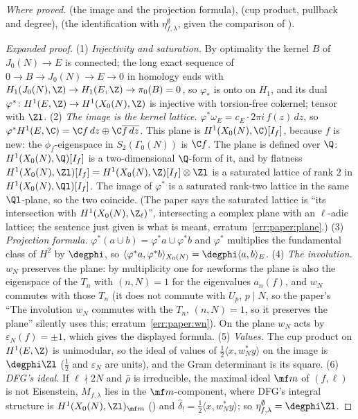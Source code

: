 \begin{sloppypar}
\noindent\emph{Where proved.}  (the image and the projection formula),  (cup product, pullback and degree),  (the
identification with $\eta^\emptyset_{f,\lambda}$, given the comparison of ).

\begin{proof}[Expanded proof]
(1) \emph{Injectivity and saturation.} By optimality the kernel $B$ of $J_0(N)\to E$ is connected; the long exact sequence of $0\to B\to J_0(N)\to E\to0$ in homology ends with
$H_1(J_0(N),\Z)\to H_1(E,\Z)\to\pi_0(B)=0$, so $\varphi_*$ is onto on $H_1$, and its dual $\varphi^*\colon H^1(E,\Z)\to H^1(X_0(N),\Z)$ is injective with torsion-free cokernel; tensor with $\Zl$.
(2) \emph{The image is the kernel lattice.} $\varphi^*\omega_E=c_E\cdot2\pi i\,f(z)\,dz$, so $\varphi^*H^1(E,\C)=\C f\,dz\oplus\C\overline{f\,dz}$. This plane is $H^1(X_0(N),\C)[I_f]$, because $f$ is new: the
$\phi_f$-eigenspace in $S_2(\Gamma_0(N))$ is $\C f$. The plane is defined over $\Q$: $H^1(X_0(N),\Q)[I_f]$ is a two-dimensional $\Q$-form of it, and by flatness
$H^1(X_0(N),\Zl)[I_f]=H^1(X_0(N),\Z)[I_f]\otimes\Zl$ is a saturated lattice of rank $2$ in $H^1(X_0(N),\Ql)[I_f]$. The image of $\varphi^*$ is a saturated rank-two lattice in the same
$\Ql$-plane, so the two coincide. (The paper says the saturated lattice is ``its intersection with $H^1(X_0(N),\Z_\ell)$'', intersecting a complex plane with an $\ell$-adic lattice;
the sentence just given is what is meant, erratum~\ref{err:paper:plane}.) (3) \emph{Projection formula.} $\varphi^*(a\cup b)=\varphi^*a\cup\varphi^*b$ and $\varphi^*$ multiplies the fundamental
class of $H^2$ by $\degphi$, so $\langle\varphi^*a,\varphi^*b\rangle_{X_0(N)}=\degphi\langle a,b\rangle_E$. (4) \emph{The involution.} $w_N$ preserves the plane: by multiplicity one for newforms the
plane is also the eigenspace of the $T_n$ with $(n,N)=1$ for the eigenvalues $a_n(f)$, and $w_N$ commutes with those $T_n$ (it does not commute with $U_p$, $p\mid N$, so the
paper's ``The involution $w_N$ commutes with the $T_n$, $(n,N)=1$, so it preserves the plane'' silently uses this; erratum~\ref{err:paper:wn}). On the plane $w_N$ acts by
$\varepsilon_N(f)=\pm1$, which gives the displayed formula. (5) \emph{Values.} The cup product on $H^1(E,\Z)$ is unimodular, so the ideal of values of $\frac12\langle x,w_N^*y\rangle$ on the
image is $\degphi\Zl$ ($\frac12$ and $\varepsilon_N$ are units), and the Gram determinant is its square. (6) \emph{DFG's ideal.} If $\ell\nmid2N$ and $\bar\rho$ is irreducible, the maximal ideal
$\mf m$ of $(f,\ell)$ is not Eisenstein, $M_{f,\lambda}$ lies in the $\mf m$-component, where DFG's integral structure is $H^1(X_0(N),\Zl)_{\mf m}$ () and
$\hat\delta_!=\frac12\langle x,w_N^*y\rangle$; so $\eta^\emptyset_{f,\lambda}=\degphi\Zl$.
\end{proof}


\end{sloppypar}
